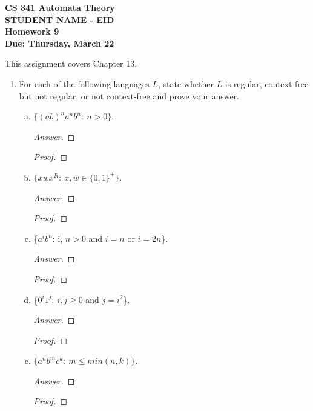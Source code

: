 \documentclass[10pt]{article}
\begin{document}
\begin{flushleft}
\textbf{\noindent
CS 341 Automata Theory \\
STUDENT NAME - EID \\
Homework 9 \\
Due: Thursday, March 22}\\
\end{flushleft}
\noindent
This assignment covers Chapter 13. \\

\begin{enumerate}[1)]


\item
For each of the following languages $L$, state whether $L$ is regular, context-free but not regular, or not context-free and prove your answer.
\begin{enumerate}[a)]
\item
$\{(ab)^na^nb^n:\ n > 0\}$.
\begin{proof}[Answer]
\end{proof}
\begin{proof}[Proof]
\end{proof}

\item
$\{xwx^R:\ x, w \in \{0, 1\}^+\}$.
\begin{proof}[Answer]
\end{proof}
\begin{proof}[Proof]
\end{proof}

\item
\{$a^ib^n$: i, $n > 0$ and $i = n$ or $i = 2n$\}.
\begin{proof}[Answer]
\end{proof}
\begin{proof}[Proof]
\end{proof}

\item
\{$0^i1^j$: $i, j \geq 0$ and $j = i^2$\}.
\begin{proof}[Answer]
\end{proof}
\begin{proof}[Proof]
\end{proof}

\item
$\{a^nb^mc^k:\ m \leq min(n, k)\}$.
\begin{proof}[Answer]
\end{proof}
\begin{proof}[Proof]
\end{proof}


\end{enumerate}
\end{enumerate}
\end{document}
